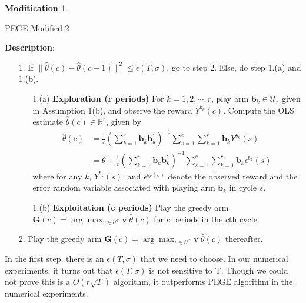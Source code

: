 \documentclass{article}
\theoremstyle{plain}
\theoremstyle{definition}
\newtheorem{modification}{Moditication}
\begin{document}
\begin{modification}
\begin{algorithm}\label{alg:PEGE2}
\caption{PEGE Modified 2}
\textbf{Description}: 
\begin{itemize}
\item [1.  ] If $\|\hat{\theta}(c)-\hat{\theta}(c-1)\|^{2}\leq \epsilon(T,\sigma)$, go to step 2. Else, do step 1.(a) and 1.(b).
\begin{enumerate}
\item [1.(a) ] \textbf{Exploration (r periods)} For $k=1,2,\cdots,r$, play arm $\textbf{b}_{k}\in \mathcal{U}_{r}$ given in Assumption 1(b), and observe the reward $Y^{b_{k}}(c)$. Compute the OLS estimate $\hat{\theta}(c)\in \mathbb{R}^{r}$, given by
\begin{align}
\hat{\theta}(c)&=\frac{1}{c}(\sum_{k=1}^{r}\textbf{b}_{k}\textbf{b}_{k}^{'})^{-1}\sum_{s=1}^{c}\sum_{k=1}^{r}\textbf{b}_{k}Y^{b_{k}}(s) \nonumber \\
&=\theta+\frac{1}{c}(\sum_{k=1}^{r}\textbf{b}_{k}\textbf{b}_{k}^{'})^{-1}\sum_{s=1}^{c}\sum_{k=1}^{r}\textbf{b}_{k}\epsilon^{b_{k}}(s) \nonumber 
\end{align}
where for any $k$, $Y^{b_{k}}(s)$, and $\epsilon^{b_{k}(s)}$ denote the observed reward and the error random variable associated with playing arm $\textbf{b}_{k}$ in cycle $s$.
\item [1.(b) ] \textbf{Exploitation (c periods)} Play the greedy arm $\textbf{G}(c)=\arg \max_{v\in \mathcal{U}^{r}}\textbf{v}^{'}\hat{\theta}(c)$ for $c$ periods in the $c$th cycle.
\end{enumerate}
\item [2.  ] Play the greedy arm $\textbf{G}(c)=\arg \max_{v\in \mathcal{U}^{r}}\textbf{v}^{'}\hat{\theta}(c)$ thereafter.
\end{itemize}

\end{algorithm}
In the first step, there is an $\epsilon(T,\sigma)$ that we need to choose. In our numerical experiments, it turns out that $\epsilon(T,\sigma)$ is not sensitive to T. Though we could not prove this is a $O(r\sqrt{T})$ algorithm, it outperforms PEGE algorithm in the numerical experiments.

\end{modification}
\end{document}
